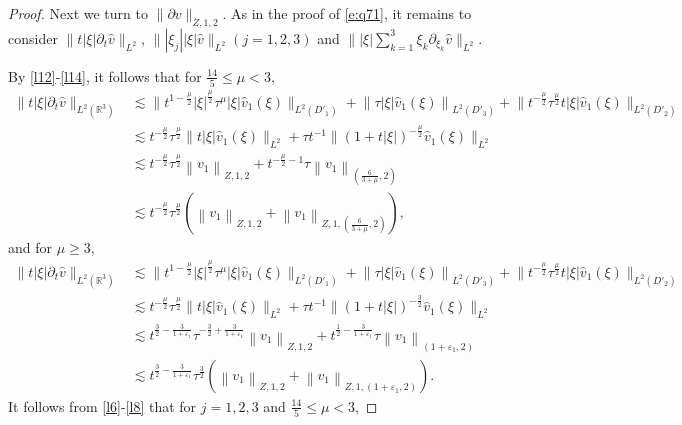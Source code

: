 \documentclass[11pt,twoside]{article}
\newcommand{\R}{\mathbb R}
\newcommand{\p}{\partial}
\newcommand{\f}{\frac}
\newcommand{\ds}{\displaystyle}
\theoremstyle{plain}
\theoremstyle{definition}
\theoremstyle{remark}
\numberwithin{equation}{section}
\begin{document}
\begin{proof}
Next we turn to  $\|\p v\|_{Z, 1, 2}$. As in the proof
of \eqref{e:q71}, it remains to consider $\|t|\xi|\p_t\hat{v}\|_{L^2}$, $\||\xi_j||\xi|\hat{v}\|_{L^2}(j=1, 2, 3)$ and $\||\xi|\ds\sum_{k=1}^3\xi_k\p_{\xi_k}\hat{v}\|_{L^2}$.

By \eqref{l12}-\eqref{l14}, it follows that for $\f{14}{5}\leq\mu<3$,
\begin{equation}\label{l22'}
\begin{aligned}
\|t|\xi|\p_t\hat{v}\|_{L^2(\R^3)} & \lesssim\big\|t^{1-\frac{\mu}{2}} |\xi|^{\frac{\mu}{2}}\tau^{\mu}|\xi| \hat{v}_1(\xi)\big\|_{L^2(D'_1)}+\left\| \tau|\xi| \hat{v}_1(\xi)\right\|_{L^2(D'_3)} +\big\|t^{-\frac{\mu}{2}}\tau^{\frac{\mu}{2}} t|\xi| \hat{v}_1(\xi)\big\|_{L^2(D'_2)} \\
& \lesssim t^{-\frac{\mu}{2}}\tau^{\frac{\mu}{2}}\big\| t|\xi|  \hat{v}_1(\xi)\big\|_{L^2}+\tau t^{-1}\big\| (1+t|\xi|)^{-\f{\mu}{2}} \hat{v}_1(\xi)\big\|_{L^2}\\
& \lesssim t^{-\frac{\mu}{2}}\tau^{\frac{\mu}{2}}\left\|v_1\right\|_{Z, 1, 2}+ t^{-\f{\mu}{2}-1} \tau \left\|v_1\right\|_{(\f{6}{3+\mu}, 2)}\\
& \lesssim t^{-\f{\mu}{2}}\tau^{\f{\mu}{2}}(\left\|v_1\right\|_{Z, 1,2}+\left\|v_1\right\|_{Z, 1,(\f{6}{3+\mu}, 2)}),
\end{aligned}
\end{equation}
and for $\mu\geq3$,
\begin{equation}\label{l22}
\begin{aligned}
\|t|\xi|\p_t\hat{v}\|_{L^2(\R^3)} & \lesssim\big\|t^{1-\frac{\mu}{2}} |\xi|^{\frac{\mu}{2}}\tau^{\mu}|\xi| \hat{v}_1(\xi)\big\|_{L^2(D'_1)}+\left\| \tau|\xi| \hat{v}_1(\xi)\right\|_{L^2(D'_3)} +\big\|t^{-\frac{\mu}{2}}\tau^{\frac{\mu}{2}} t|\xi| \hat{v}_1(\xi)\big\|_{L^2(D'_2)} \\
& \lesssim t^{-\frac{\mu}{2}}\tau^{\frac{\mu}{2}}\big\| t|\xi|  \hat{v}_1(\xi)\big\|_{L^2}+\tau t^{-1}\big\| (1+t|\xi|)^{-\f32} \hat{v}_1(\xi)\big\|_{L^2}\\
& \lesssim t^{\f32-\frac{3}{1+\varepsilon_1}} \tau^{-\f32+\frac{3}{1+\varepsilon_1}}\left\|v_1\right\|_{Z, 1, 2}+ t^{\f12-\frac{3}{1+\varepsilon_1}} \tau\left\|v_1\right\|_{(1+\varepsilon_1, 2)}\\
& \lesssim t^{\f32-\frac{3}{1+\varepsilon_1}} \tau^{\f32}(\left\|v_1\right\|_{Z, 1, 2}+\left\|v_1\right\|_{Z, 1, \left(1+\varepsilon_1, 2\right)}).
\end{aligned}
\end{equation}
It follows from \eqref{l6}-\eqref{l8} that for $j=1, 2, 3$ and $\f{14}{5}\leq\mu<3$,

\end{proof}
\end{document}
